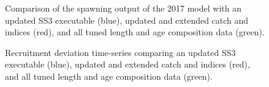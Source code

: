 \documentclass[
]{scrartcl}
\begin{document}
\begin{figure}


\caption{\label{fig-bridge14-comp2}Comparison of the spawning output of
the 2017 model with an updated SS3 executable (blue), updated and
extended catch and indices (red), and all tuned length and age
composition data (green).}

\end{figure}%

\begin{figure}


\caption{\label{fig-bridge14-comp11}Recruitment deviation time-series
comparing an updated SS3 executable (blue), updated and extended catch
and indices (red), and all tuned length and age composition data
(green).}

\end{figure}%
\end{document}
